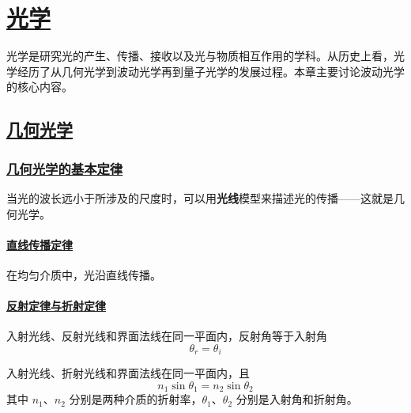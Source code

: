 \chapter{\protect\hyperlink{:}{光学}}


光学是研究光的产生、传播、接收以及光与物质相互作用的学科。从历史上看，光学经历了从几何光学到波动光学再到量子光学的发展过程。本章主要讨论波动光学的核心内容。


\section{\protect\hyperlink{:}{几何光学}}

\subsection{\protect\hyperlink{:}{几何光学的基本定律}}

当光的波长远小于所涉及的尺度时，可以用\textbf{光线}模型来描述光的传播——这就是几何光学。

\subsubsection{\protect\hyperlink{:}{直线传播定律}}

在均匀介质中，光沿直线传播。

\subsubsection{\protect\hyperlink{:}{反射定律与折射定律}}

\begin{theorem}[反射定律]
    入射光线、反射光线和界面法线在同一平面内，反射角等于入射角
    \begin{equation}
        \theta_r = \theta_i
    \end{equation}
\end{theorem}

\begin{theorem}
    入射光线、折射光线和界面法线在同一平面内，且
    \begin{equation}
        n_1\sin\theta_1 = n_2\sin\theta_2
    \end{equation}
    其中 $n_1$、$n_2$ 分别是两种介质的折射率，$\theta_1$、$\theta_2$ 分别是入射角和折射角。
\end{theorem}

